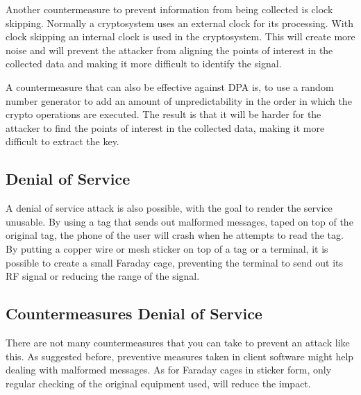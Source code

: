 Another countermeasure to prevent information from being collected is clock skipping.
Normally a cryptosystem uses an external clock for its processing.
With clock skipping an internal clock is used in the cryptosystem.
This will create more noise and will prevent the attacker from aligning the points of interest in the collected data and making it more difficult to identify the signal. 

A countermeasure that can also be effective against DPA is, to use a random number generator to add an amount of unpredictability in the order in which the crypto operations are executed.
The result is that it will be harder for the attacker to find the points of interest in the collected data, making it more difficult to extract the key. \cite{kocher2009differential}


\subsection{Denial of Service}
A denial of service attack is also possible, with the goal to render the service unusable. By using a tag that sends out malformed messages, taped on top of the original tag, the phone of the user will crash when he attempts to read the tag.
By putting a copper wire or mesh sticker on top of a tag or a terminal, it is possible to create a small Faraday cage, preventing the terminal to send out its RF signal or reducing the range of the signal. \cite{rieback2006your}

\subsection{Countermeasures Denial of Service}
There are not many countermeasures that you can take to prevent an attack like this. As suggested before, preventive measures taken in client software might help dealing with malformed messages. 
As for Faraday cages in sticker form, only regular checking of the original equipment used, will reduce the impact.

